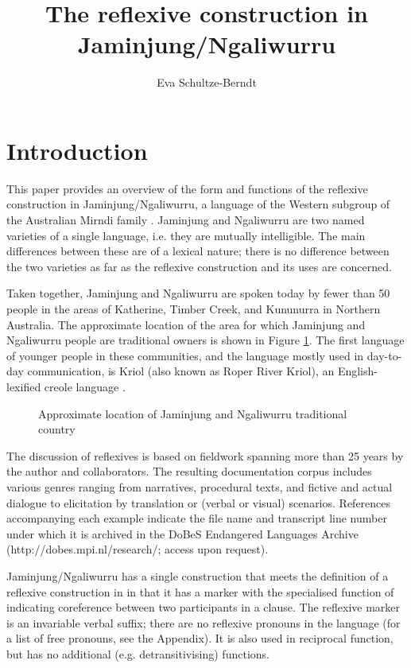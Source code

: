 \documentclass[output=paper,colorlinks,citecolor=brown]{langscibook}
\author{Eva Schultze-Berndt\affiliation{University of Manchester}}
\title{The reflexive construction in Jaminjung/Ngaliwurru}
\begin{document}
\maketitle

\section{Introduction} 
\label{sec:SchultzeBernd:1}
This paper provides an overview of the form and functions of the reflexive construction in Jaminjung/Ngaliwurru, a language of the Western subgroup of the Australian Mirndi family \citep{Chadwick1997,Harvey2008}. Jaminjung and Ngaliwurru are two named varieties of a single language, i.e. they are mutually intelligible. The main differences between these are of a lexical nature; there is no difference between the two varieties as far as the reflexive construction and its uses are concerned. 

Taken together, Jaminjung and Ngaliwurru are spoken today by fewer than 50 people in the areas of Katherine, Timber Creek, and Kununurra in Northern Australia. The approximate location of the area for which Jaminjung and Ngaliwurru people are traditional owners is shown in Figure \ref{fig:map}. The first language of younger people in these communities, and the language mostly used in day-to-day communication, is Kriol (also known as Roper River Kriol), an English-lexified creole language \citep{Harris1986,SchultzeBerndt2013}.

\begin{figure}
  \caption{Approximate location of Jaminjung and Ngaliwurru traditional country}
  \label{fig:map}
\end{figure}

The discussion of reflexives is based on fieldwork spanning more than 25 years by the author and collaborators. The resulting documentation corpus \cite{ComrieSchultzeBerndt2016} includes various genres ranging from narratives, procedural texts, and fictive and actual dialogue to elicitation by translation or (verbal or visual) scenarios.  References accompanying each example indicate the file name and transcript line number under which it is archived in the DoBeS Endangered Languages Archive (http://dobes.mpi.nl/research/; access upon request).

Jaminjung/Ngaliwurru has a single construction that meets the definition of a reflexive construction in \citet{Haspelmath_thisvolume}  in that it has a marker with the specialised function of indicating coreference between two participants in a clause. The reflexive marker is an invariable verbal suffix; there are no reflexive pronouns in the language (for a list of free pronouns, see the Appendix). It is also used in reciprocal function, but has no additional (e.g. detransitivising) functions. 
\end{document}
